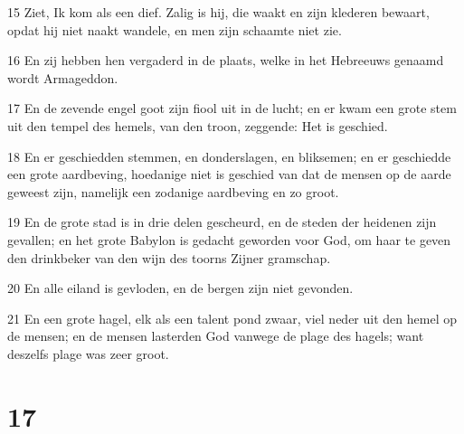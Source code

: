 \par 15 Ziet, Ik kom als een dief. Zalig is hij, die waakt en zijn klederen bewaart, opdat hij niet naakt wandele, en men zijn schaamte niet zie.
\par 16 En zij hebben hen vergaderd in de plaats, welke in het Hebreeuws genaamd wordt Armageddon.
\par 17 En de zevende engel goot zijn fiool uit in de lucht; en er kwam een grote stem uit den tempel des hemels, van den troon, zeggende: Het is geschied.
\par 18 En er geschiedden stemmen, en donderslagen, en bliksemen; en er geschiedde een grote aardbeving, hoedanige niet is geschied van dat de mensen op de aarde geweest zijn, namelijk een zodanige aardbeving en zo groot.
\par 19 En de grote stad is in drie delen gescheurd, en de steden der heidenen zijn gevallen; en het grote Babylon is gedacht geworden voor God, om haar te geven den drinkbeker van den wijn des toorns Zijner gramschap.
\par 20 En alle eiland is gevloden, en de bergen zijn niet gevonden.
\par 21 En een grote hagel, elk als een talent pond zwaar, viel neder uit den hemel op de mensen; en de mensen lasterden God vanwege de plage des hagels; want deszelfs plage was zeer groot.

\chapter{17}

